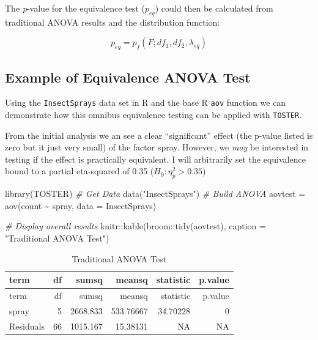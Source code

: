 \documentclass[]{interact}
\theoremstyle{plain}%
\theoremstyle{definition}
\theoremstyle{remark}
\newenvironment{Shaded}{\begin{snugshade}}{\end{snugshade}}
\newcommand{\AttributeTok}[1]{\textcolor[rgb]{0.77,0.63,0.00}{#1}}
\newcommand{\CommentTok}[1]{\textcolor[rgb]{0.56,0.35,0.01}{\textit{#1}}}
\newcommand{\FunctionTok}[1]{\textcolor[rgb]{0.00,0.00,0.00}{#1}}
\newcommand{\NormalTok}[1]{#1}
\newcommand{\OtherTok}[1]{\textcolor[rgb]{0.56,0.35,0.01}{#1}}
\newcommand{\SpecialCharTok}[1]{\textcolor[rgb]{0.00,0.00,0.00}{#1}}
\newcommand{\StringTok}[1]{\textcolor[rgb]{0.31,0.60,0.02}{#1}}
\begin{document}
The \emph{p}-value for the equivalence test (\(p_{eq}\)) could then be
calculated from traditional ANOVA results and the distribution function:

\[
p_{eq} = p_f(F; df_1, df_2, \lambda_{eq})
\]

\hypertarget{example-of-equivalence-anova-test}{%
\subsection{Example of Equivalence ANOVA
Test}\label{example-of-equivalence-anova-test}}

Using the \texttt{InsectSprays} data set in R and the base R
\texttt{aov} function we can demonstrate how this omnibus equivalence
testing can be applied with \texttt{TOSTER}.

From the initial analysis we an see a clear ``significant'' effect (the
p-value listed is zero but it just very small) of the factor spray.
However, we \emph{may} be interested in testing if the effect is
practically equivalent. I will arbitrarily set the equivalence bound to
a partial eta-squared of 0.35 (\(H_0: \eta^2_p > 0.35\))

\begin{Shaded}
\begin{Highlighting}[]
\FunctionTok{library}\NormalTok{(TOSTER)}
\CommentTok{\# Get Data}
\FunctionTok{data}\NormalTok{(}\StringTok{"InsectSprays"}\NormalTok{)}
\CommentTok{\# Build ANOVA}
\NormalTok{aovtest }\OtherTok{=} \FunctionTok{aov}\NormalTok{(count }\SpecialCharTok{\textasciitilde{}}\NormalTok{ spray,}
              \AttributeTok{data =}\NormalTok{ InsectSprays)}

\CommentTok{\# Display overall results}
\NormalTok{knitr}\SpecialCharTok{::}\FunctionTok{kable}\NormalTok{(broom}\SpecialCharTok{::}\FunctionTok{tidy}\NormalTok{(aovtest),}
            \AttributeTok{caption =} \StringTok{"Traditional ANOVA Test"}\NormalTok{)}
\end{Highlighting}
\end{Shaded}

\begin{longtable}[]{@{}lrrrrr@{}}
\caption{Traditional ANOVA Test}\tabularnewline
\toprule
term & df & sumsq & meansq & statistic & p.value \\
\midrule
\endfirsthead
\toprule
term & df & sumsq & meansq & statistic & p.value \\
\midrule
\endhead
spray & 5 & 2668.833 & 533.76667 & 34.70228 & 0 \\
Residuals & 66 & 1015.167 & 15.38131 & NA & NA \\
\bottomrule
\end{longtable}
\end{document}
